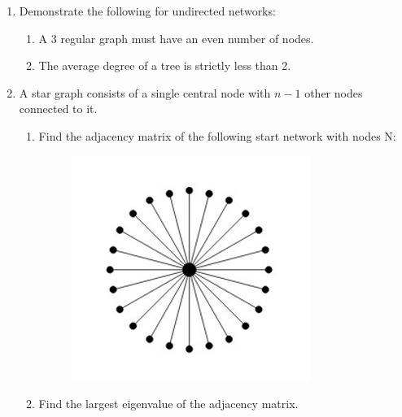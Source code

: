 \documentclass{amsart}
\theoremstyle{definition}
\theoremstyle{remark}
\numberwithin{equation}{section}
\begin{document}
\clearpage
\begin{enumerate}


\item Demonstrate the following for undirected networks:
\begin{enumerate}
\item A 3 regular graph must have an even number of nodes.\vspace{5cm}



\item The average degree of a tree is strictly less than 2.



\end{enumerate}

\vspace{5cm}

\item A star graph consists of a single central node with $n-1$ other nodes connected to it. 
\begin{enumerate}
\item Find the adjacency matrix of the following start network with nodes N:
\begin{figure}[h]
\includegraphics[width=0.3\linewidth]{images/stargraph.PNG}
\end{figure}



\item Find the largest eigenvalue of the adjacency matrix. 




\end{enumerate}
\end{enumerate}
\end{document}
